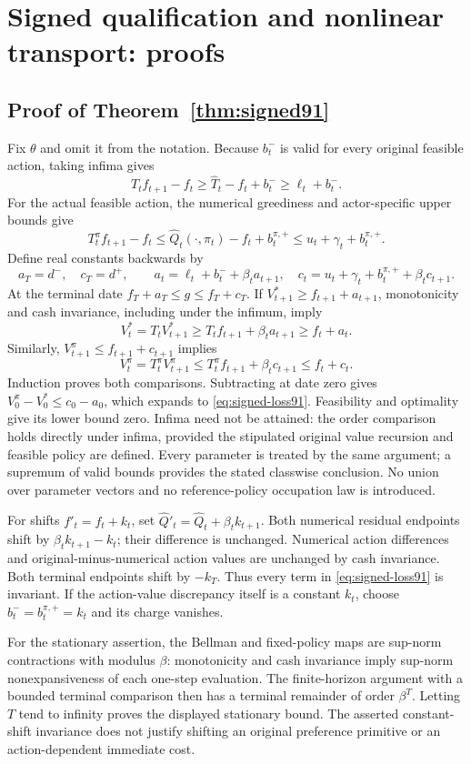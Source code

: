 \section{Signed qualification and nonlinear transport: proofs}\label{supp:signed91}
\subsection{Proof of Theorem~\ref{thm:signed91}}
Fix $\theta$ and omit it from the notation. Because $b^-_t$ is valid for every original feasible action, taking infima gives
\[
 T_tf_{t+1}-f_t\ge\widehat T_t-f_t+b^-_t\ge\ell_t+b^-_t.
\]
For the actual feasible action, the numerical greediness and actor-specific upper bounds give
\[
 T_t^\pi f_{t+1}-f_t
 \le\widehat Q_t(\cdot,\pi_t)-f_t+b^{\pi,+}_t
 \le u_t+\gamma_t+b^{\pi,+}_t.
\]
Define real constants backwards by
\[
 a_T=d^-,\quad c_T=d^+,\qquad
 a_t=\ell_t+b^-_t+\beta_ta_{t+1},\quad
 c_t=u_t+\gamma_t+b^{\pi,+}_t+\beta_tc_{t+1}.
\]
At the terminal date $f_T+a_T\le g\le f_T+c_T$. If $V_{t+1}^*\ge f_{t+1}+a_{t+1}$, monotonicity and cash invariance, including under the infimum, imply
\[
 V_t^*=T_tV_{t+1}^*
 \ge T_tf_{t+1}+\beta_ta_{t+1}\ge f_t+a_t.
\]
Similarly, $V_{t+1}^\pi\le f_{t+1}+c_{t+1}$ implies
\[
 V_t^\pi=T_t^\pi V_{t+1}^\pi
 \le T_t^\pi f_{t+1}+\beta_tc_{t+1}\le f_t+c_t.
\]
Induction proves both comparisons. Subtracting at date zero gives $V_0^\pi-V_0^*\le c_0-a_0$, which expands to \eqref{eq:signed-loss91}. Feasibility and optimality give its lower bound zero. Infima need not be attained: the order comparison holds directly under infima, provided the stipulated original value recursion and feasible policy are defined. Every parameter is treated by the same argument; a supremum of valid bounds provides the stated classwise conclusion. No union over parameter vectors and no reference-policy occupation law is introduced.

For shifts $f'_t=f_t+k_t$, set $\widehat Q'_t=\widehat Q_t+\beta_t k_{t+1}$. Both numerical residual endpoints shift by $\beta_t k_{t+1}-k_t$; their difference is unchanged. Numerical action differences and original-minus-numerical action values are unchanged by cash invariance. Both terminal endpoints shift by $-k_T$. Thus every term in \eqref{eq:signed-loss91} is invariant. If the action-value discrepancy itself is a constant $k_t$, choose $b^-_t=b^{\pi,+}_t=k_t$ and its charge vanishes.

For the stationary assertion, the Bellman and fixed-policy maps are sup-norm contractions with modulus $\beta$: monotonicity and cash invariance imply sup-norm nonexpansiveness of each one-step evaluation. The finite-horizon argument with a bounded terminal comparison then has a terminal remainder of order $\beta^T$. Letting $T$ tend to infinity proves the displayed stationary bound. The asserted constant-shift invariance does not justify shifting an original preference primitive or an action-dependent immediate cost.

